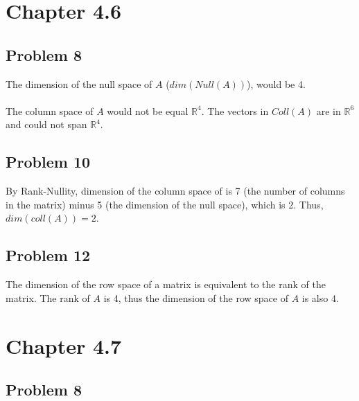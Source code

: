 \documentclass{article}%
\begin{document}
\section*{Chapter 4.6}

\subsection*{Problem 8}

The dimension of the null space of $A$ ($dim(Null(A))$), would be 4.\\
\\
The column space of $A$ would not be equal $\mathbb{R}^4$. The vectors in $Coll(A)$ are in $\mathbb{R}^6$ and could not span $\mathbb{R}^4$.

\subsection*{Problem 10}

By Rank-Nullity, dimension of the column space of is 7 (the number of columns in the matrix) minus 5 (the dimension of the null space), which is 2. Thus, $dim(coll(A)) = 2$.

\subsection*{Problem 12}

The dimension of the row space of a matrix is equivalent to the rank of the matrix. The rank of $A$ is 4, thus the dimension of the row space of $A$ is also 4.

\section*{Chapter 4.7}

\subsection*{Problem 8}
\end{document}
